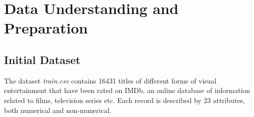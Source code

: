 \chapter{Data Understanding and Preparation}
\label{ch:capitolo1}

\section{Initial Dataset}\label{sec:data_semantics}
The dataset \textit{train.csv} contains 16431 titles of different forms of visual entertainment that have been rated on IMDb, 
an online database of information related to films, television series etc. 
Each record is described by 23 attributes, both numerical and non-numerical. 



